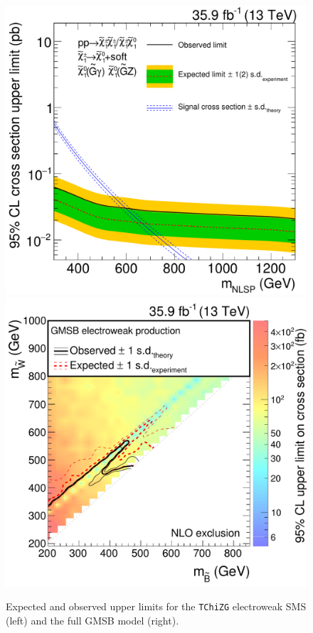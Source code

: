 \begin{figure}[btp]
 \centering
 \includegraphics[width=\pairwidth]{figures/EndorsementPlots/TChiNG_limit2}
 \includegraphics[width=\pairwidth]{figures/EndorsementPlots/GMSB_limits_XSEC2}
 \caption{Expected and observed upper limits for the \texttt{TChiZG} electroweak SMS (left) and the full GMSB model (right).}
 \label{fig:limitEWK}
\end{figure}

